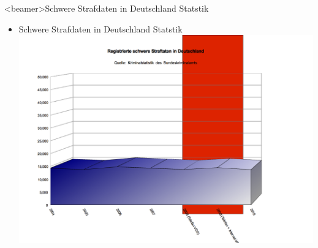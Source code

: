 \begin{frame}<beamer>{Schwere Strafdaten in Deutschland Statstik}
\begin{itemize}
        \item Schwere Strafdaten in Deutschland Statstik
        \includegraphics[height=1\textheight]{sections/img/schwere_verbrechen_in_DE.png}
    \end{itemize}
    \end{frame}
    
